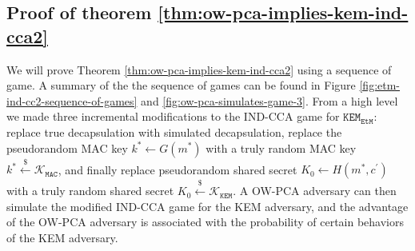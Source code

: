 \documentclass[journal=tches,submission]{iacrtrans}
\newcommand{\kem}{\texttt{KEM}}
\newcommand{\etm}{\texttt{EtM}}  %
\newcommand{\mac}{\texttt{MAC}}
\newcommand{\leftsample}{\stackrel{\$}{\leftarrow}}
\begin{document}
\subsection{Proof of theorem \ref{thm:ow-pca-implies-kem-ind-cca2}}\label{sec:proof-of-theorem}
We will prove Theorem \ref{thm:ow-pca-implies-kem-ind-cca2} using a sequence of game. A summary of the the sequence of games can be found in Figure \ref{fig:etm-ind-cc2-sequence-of-games} and \ref{fig:ow-pca-simulates-game-3}. From a high level we made three incremental modifications to the IND-CCA game for $\kem_\etm$: replace true decapsulation with simulated decapsulation, replace the pseudorandom MAC key $k^\ast \leftarrow G(m^\ast)$ with a truly random MAC key $k^\ast \leftsample \mathcal{K}_\mac$, and finally replace pseudorandom shared secret $K_0 \leftarrow H(m^\ast, c^\prime)$ with a truly random shared secret $K_0 \leftsample \mathcal{K}_\kem$. A OW-PCA adversary can then simulate the modified IND-CCA game for the KEM adversary, and the advantage of the OW-PCA adversary is associated with the probability of certain behaviors of the KEM adversary.
\end{document}
